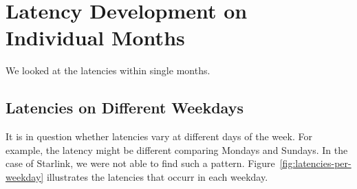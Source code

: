 \section{Latency Development on Individual Months}
\label{sec:latency-individual-months}

We looked at the latencies within single months.

\subsection{Latencies on Different Weekdays}
\label{sec:latency-weekdays}

It is in question whether latencies vary at different days of the week. For
example, the latency might be different comparing Mondays and Sundays. In the
case of Starlink, we were not able to find such a pattern.
Figure~\ref{fig:latencies-per-weekday} illustrates the latencies that occurr in
each weekday.

